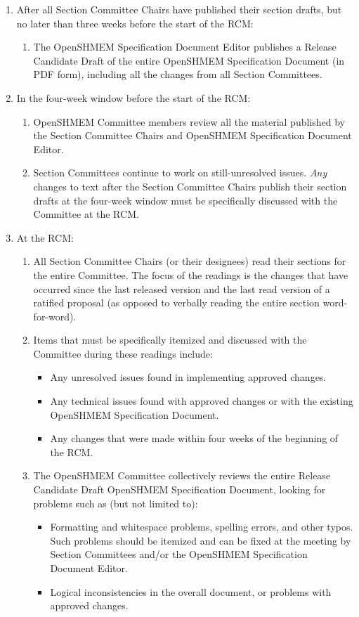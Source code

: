 \begin{enumerate}
\item After all Section Committee Chairs have published their section
  drafts, but no later than three weeks before the start of the RCM:
  \begin{enumerate}
  \item The OpenSHMEM Specification Document Editor publishes a Release Candidate
    Draft of the entire OpenSHMEM Specification Document (in PDF form), including
    all the changes from all Section Committees.
  \end{enumerate}

\item In the four-week window before the start of the RCM:
  \begin{enumerate}
  \item OpenSHMEM Committee members review all the material published by the
    Section Committee Chairs and OpenSHMEM Specification Document Editor.
  \item Section Committees continue to work on still-unresolved
    issues.  {\em Any} changes to text after the Section
      Committee Chairs publish their section drafts at the four-week
    window must be specifically discussed with the Committee at the RCM.
  \end{enumerate}

\item At the RCM:
  \begin{enumerate}
  \item All Section Committee Chairs (or their designees) read their
    sections for the entire Committee.  The focus of the readings is the
    changes that have occurred since the last released version and the last read version of a ratified proposal (as
    opposed to verbally reading the entire section word-for-word).
  \item Items that must be specifically itemized and discussed with
    the Committee during these readings include:
    \begin{itemize}
    \item Any unresolved issues found in implementing approved
      changes.
    \item Any technical issues found with approved changes or with the
      existing OpenSHMEM Specification Document.
    \item Any changes that were made within four weeks of the
      beginning of the RCM.
    \end{itemize}

  \item The OpenSHMEM Committee collectively reviews the entire Release
    Candidate Draft OpenSHMEM Specification Document, looking for problems such
    as (but not limited to):
    \begin{itemize}
    \item Formatting and whitespace problems, spelling errors, and
      other typos.  Such problems should be itemized and can be fixed
      at the meeting by Section Committees and/or the OpenSHMEM Specification
      Document Editor.
    \item Logical inconsistencies in the overall document, or problems
      with approved changes.
    \end{itemize}


\end{enumerate}
\end{enumerate}
